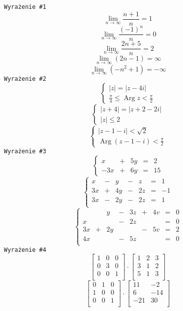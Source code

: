 \documentclass[12pt]{article}
\begin{document}
\texttt{Wyrażenie \#1}
$$\lim_{n\to \infty} \frac{n+1}{n}=1$$
$$\lim_{n\to\infty} \frac{(-1)^n}{n}=0$$
$$\lim_{n\to\infty} \frac{2n+5}{n}=2$$
$$\lim_{n\to\infty} (2n-1)=\infty$$
$$\lim_{n\to\infty} (-n^2+1)=-\infty$$
\texttt{Wyrażenie \#2}
$$
\begin{cases}
|z| = |z-4i| \\
\frac{\pi}{4} \leq \operatorname{Arg}z < \frac{\pi}{2}
\end{cases}
$$
$$
\begin{cases}
|z+4|=|z+2-2i| \\
|z| \leq 2
\end{cases}
$$
$$
\begin{cases}
|z-1-i|<\sqrt{2} \\
\operatorname{Arg}(z-1-i)<\frac{\pi}{2}
\end{cases}
$$
\texttt{Wyrażenie \#3}
$$
\left\{
\begin{array}{rcrcr}
x & + & 5y& = & 2\\
-3x & + & 6y & = & 15
\end{array}
\right.
$$
$$
\left\{
\begin{array}{rcrcrcr}
x& - & y & - & z & = & 1 \\
3x& + & 4y & - & 2z & = & -1 \\
3x& - & 2y & - & 2z & = & 1 \\
\end{array}
\right.
$$
$$
\left\{
\begin{array}{rcrcrcrcr}
&  & y & - & 3z & +& 4v&= & 0 \\
x&  &  & - & 2z & &&= & 0 \\
3x& + & 2y &  &  & - & 5v&= & 2 \\
4x&  &  & - & 5z & &&= & 0 \\
\end{array}
\right.
$$
\texttt{Wyrażenie \#4}
$$
\left[
\begin{array}{ccc}
1 & 0 & 0 \\
0 & 3 & 0 \\
0 & 0 & 1 \\
\end{array}
\right]
\cdot 
\left[
\begin{array}{ccc}
1 & 2 & 3 \\
3 & 1 & 2 \\
5 & 1 & 3 \\
\end{array}
\right]
$$
$$
\left[
\begin{array}{ccc}
0 & 1 & 0 \\
1 & 0 & 0 \\
0 & 0 & 1 \\
\end{array}
\right]
\cdot 
\left[
\begin{array}{cc}
11 & -2  \\
6 & -14 \\
-21& 30 \\
\end{array}
\right]
$$
\end{document}
